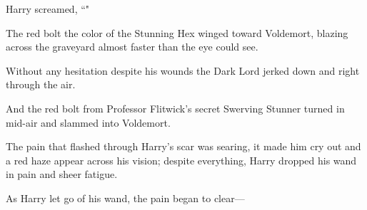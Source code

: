 Harry screamed, ``"

The red bolt the color of the Stunning Hex winged toward Voldemort, blazing across the graveyard almost faster than the eye could see.

Without any hesitation despite his wounds the Dark Lord jerked down and right through the air.

And the red bolt from Professor Flitwick's secret Swerving Stunner turned in mid-air and slammed into Voldemort.

The pain that flashed through Harry's scar was searing, it made him cry out and a red haze appear across his vision; despite everything, Harry dropped his wand in pain and sheer fatigue.

As Harry let go of his wand, the pain began to clear—

